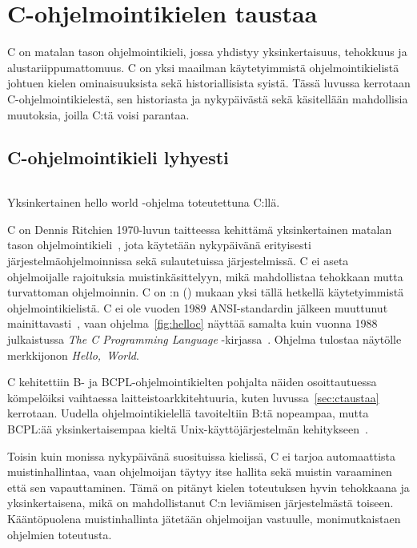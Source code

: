 \section{C-ohjelmointikielen taustaa}

C on matalan tason ohjelmointikieli, jossa yhdistyy yksinkertaisuus, tehokkuus
ja alustariippumattomuus. C on yksi maailman käytetyimmistä
ohjelmointikielistä~\citep{tiobe} johtuen kielen ominaisuuksista sekä
historiallisista syistä. Tässä luvussa kerrotaan C-ohjelmointikielestä, sen
historiasta ja nykypäivästä sekä käsitellään mahdollisia muutoksia, joilla C:tä
voisi parantaa.

\subsection{C-ohjelmointikieli lyhyesti}
\label{sec:clyhyesti}


\begin{listing}[ht!]
    \inputminted{C}{koodi/hello.c}
    \caption{Yksinkertainen hello world -ohjelma toteutettuna C:llä.}
    \label{fig:helloc}
\end{listing}

C on Dennis Ritchien 1970-luvun taitteessa kehittämä yksinkertainen matalan
tason ohjelmointikieli~\citep{chistory}, jota käytetään nykypäivänä erityisesti
järjestelmäohjelmoinnissa sekä sulautetuissa järjestelmissä. C ei aseta
ohjelmoijalle rajoituksia muistinkäsittelyyn, mikä mahdollistaa tehokkaan mutta
turvattoman ohjelmoinnin. C on \citeauthor{tiobe}:n (\citeyear{tiobe}) mukaan
yksi tällä hetkellä käytetyimmistä ohjelmointikielistä. C ei ole vuoden 1989
ANSI-standardin jälkeen muuttunut mainittavasti~\citep{chistory, C18}, vaan
ohjelma~\ref{fig:helloc} näyttää samalta kuin vuonna 1988 julkaistussa
\emph{The C Programming Language} -kirjassa~\citep{krsecond}. Ohjelma tulostaa
näytölle merkkijonon \emph{Hello,~World}.

C kehitettiin B- ja BCPL-ohjelmointikielten pohjalta näiden osoittautuessa
kömpelöiksi vaihtaessa laitteistoarkkitehtuuria, kuten
luvussa~\ref{sec:ctaustaa} kerrotaan. Uudella ohjelmointikielellä tavoiteltiin
B:tä nopeampaa, mutta BCPL:ää yksinkertaisempaa kieltä Unix-käyttöjärjestelmän
kehitykseen~\citep{chistory}.

Toisin kuin monissa nykypäivänä suosituissa kielissä, C ei tarjoa automaattista
muistinhallintaa, vaan ohjelmoijan täytyy itse hallita sekä muistin varaaminen
että sen vapauttaminen. Tämä on pitänyt kielen toteutuksen hyvin tehokkaana ja
yksinkertaisena, mikä on mahdollistanut C:n leviämisen järjestelmästä toiseen.
Kääntöpuolena muistinhallinta jätetään ohjelmoijan vastuulle, monimutkaistaen
ohjelmien toteutusta.

